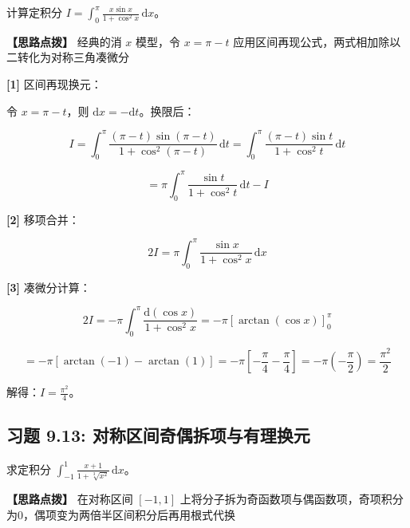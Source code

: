 \documentclass[11pt,a4paper,UTF8]{ctexart}
\begin{document}
计算定积分 $I = \int_0^\pi \frac{x\sin x}{1+\cos^2 x}\,\mathrm{d}x$。

\textbf{\color{DeepPurple}【思路点拨】} 经典的消 $x$ 模型，令 $x = \pi - t$ 应用区间再现公式，两式相加除以二转化为对称三角凑微分


\begin{solbox}[分步推导与答题规范]
\textbf{[1]} 区间再现换元：

令 $x = \pi - t$，则 $\mathrm{d}x = -\mathrm{d}t$。换限后：


\begin{equation*}
I = \int_0^\pi \frac{(\pi - t)\sin(\pi - t)}{1 + \cos^2(\pi - t)}\,\mathrm{d}t = \int_0^\pi \frac{(\pi - t)\sin t}{1 + \cos^2 t}\,\mathrm{d}t
\end{equation*}



\begin{equation*}
= \pi\int_0^\pi \frac{\sin t}{1 + \cos^2 t}\,\mathrm{d}t - I
\end{equation*}


\textbf{[2]} 移项合并：


\begin{equation*}
2I = \pi\int_0^\pi \frac{\sin x}{1 + \cos^2 x}\,\mathrm{d}x
\end{equation*}


\textbf{[3]} 凑微分计算：


\begin{equation*}
2I = -\pi\int_0^\pi \frac{\mathrm{d}(\cos x)}{1 + \cos^2 x} = -\pi\left[ \arctan(\cos x) \right]_0^\pi
\end{equation*}



\begin{equation*}
= -\pi\left[ \arctan(-1) - \arctan(1) \right] = -\pi\left[ -\frac{\pi}{4} - \frac{\pi}{4} \right] = -\pi\left(-\frac{\pi}{2}\right) = \frac{\pi^2}{2}
\end{equation*}


解得：$I = \frac{\pi^2}{4}$。
\end{solbox}


\subsection{习题 9.13: 对称区间奇偶拆项与有理换元}

求定积分 $\int_{-1}^1 \frac{x+1}{1+\sqrt[3]{x^2}}\,\mathrm{d}x$。

\textbf{\color{DeepPurple}【思路点拨】} 在对称区间 $[-1, 1]$ 上将分子拆为奇函数项与偶函数项，奇项积分为0，偶项变为两倍半区间积分后再用根式代换
\end{document}
